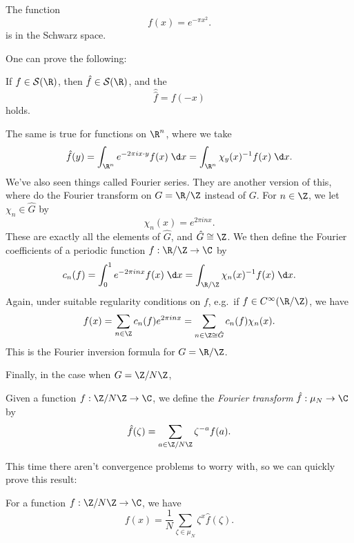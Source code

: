 \documentclass[a4paper]{article}
\begin{document}
\begin{eg}
  The function
  \[
    f(x) = e^{-\pi x^2}.
  \]
  is in the Schwarz space.
\end{eg}

One can prove the following:
\begin{prop}
  If $f \in \mathcal{S}(\R)$, then $\hat{f} \in \mathcal{S}(\R)$, and the 
  \[
    \hat{\hat{f}} = f(-x)
  \]
  holds.
\end{prop}

The same is true for functions on $\R^n$, where we take
\[
  \hat{f}(y) = \int_{\R^n} e^{-2\pi i x\cdot y} f(x) \;\d x = \int_{\R^n} \chi_y(x)^{-1} f(x)\;\d x.
\]
We've also seen things called Fourier series. They are another version of this, where do the Fourier transform on $G = \R/\Z$ instead of $G$. For $n \in \Z$, we let $\chi_n \in \hat{G}$ by
\[
  \chi_n(x) = e^{2\pi i nx}.
\]
These are exactly all the elements of $\hat{G}$, and $\hat{G} \cong \Z$. We then define the Fourier coefficients of a periodic function $f: \R/\Z \to \C$ by
\[
  c_n(f) = \int_0^1 e^{-2\pi i n x} f(x) \;\d x = \int_{\R/\Z} \chi_n(x)^{-1} f(x) \;\d x.
\]
Again, under suitable regularity conditions on $f$, e.g.\ if $f \in C^\infty(\R/\Z)$, we have
\[
  f(x) = \sum_{n \in \Z} c_n(f) e^{2\pi i nx} = \sum_{n \in \Z \cong \hat{G}} c_n(f) \chi_n(x).
\]
This is the Fourier inversion formula for $G = \R/\Z$.

Finally, in the case when $G = \Z/N\Z$,
\begin{defi}
  Given a function $f: \Z/N\Z \to \C$, we define the \emph{Fourier transform} $\hat{f}: \mu_N \to \C$ by
  \[
    \hat{f}(\zeta) = \sum_{a \in \Z/N\Z} \zeta^{-a} f(a).
  \]
\end{defi}

This time there aren't convergence problems to worry with, so we can quickly prove this result:
\begin{prop}
  For a function $f: \Z/N\Z \to \C$, we have
  \[
    f(x) = \frac{1}{N} \sum_{\zeta \in \mu_N} \zeta^x \hat{f}(\zeta).
  \]
\end{prop}
\end{document}
